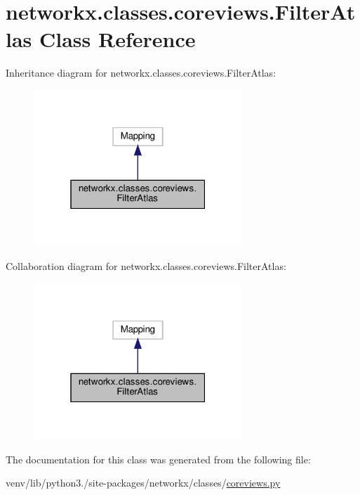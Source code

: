 \hypertarget{classnetworkx_1_1classes_1_1coreviews_1_1FilterAtlas}{}\section{networkx.\+classes.\+coreviews.\+Filter\+Atlas Class Reference}
\label{classnetworkx_1_1classes_1_1coreviews_1_1FilterAtlas}


Inheritance diagram for networkx.\+classes.\+coreviews.\+Filter\+Atlas\+:
\nopagebreak
\begin{figure}[H]
\begin{center}
\leavevmode
\includegraphics[width=223pt]{classnetworkx_1_1classes_1_1coreviews_1_1FilterAtlas__inherit__graph}
\end{center}
\end{figure}


Collaboration diagram for networkx.\+classes.\+coreviews.\+Filter\+Atlas\+:
\nopagebreak
\begin{figure}[H]
\begin{center}
\leavevmode
\includegraphics[width=223pt]{classnetworkx_1_1classes_1_1coreviews_1_1FilterAtlas__coll__graph}
\end{center}
\end{figure}


The documentation for this class was generated from the following file\+:\begin{DoxyCompactItemize}
\item 
venv/lib/python3./site-\/packages/networkx/classes/\hyperlink{coreviews_8py}{coreviews.\+py}\end{DoxyCompactItemize}
